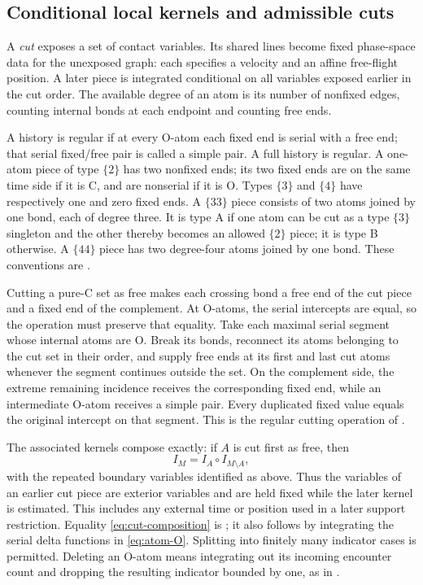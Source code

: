 \subsection{Conditional local kernels and admissible cuts}

A \emph{cut} exposes a set of contact variables. Its shared lines
become fixed phase-space data for the unexposed graph: each specifies
a velocity and an affine free-flight position. A later piece is
integrated conditional on all variables exposed earlier in the cut
order. The available degree of an atom is its number of nonfixed edges,
counting internal bonds at each endpoint and counting free ends.

A history is regular if at every O-atom each fixed end is serial
with a free end; that serial
fixed/free pair is called a simple pair. A full history is regular.
A one-atom piece of type \(\{2\}\) has two nonfixed ends; its two fixed
ends are on the same time side if it is C, and are nonserial if it is O.
Types \(\{3\}\) and \(\{4\}\) have respectively one and zero fixed
ends. A \(\{33\}\) piece consists of two atoms joined by one bond,
each of degree three. It is type A if one atom can be cut as a type
\(\{3\}\) singleton and the other thereby becomes an allowed
\(\{2\}\) piece; it is type B
otherwise. A \(\{44\}\) piece has two degree-four atoms joined by one
bond. These conventions are
\cite[Definitions 8.2 and 8.11]{DHM2025}.

Cutting a pure-C set as free makes each crossing bond a free end of the
cut piece and a fixed end of the complement. At O-atoms, the serial
intercepts are equal, so the operation must preserve that equality.
Take each maximal serial segment whose internal atoms are O. Break its
bonds, reconnect its atoms belonging to the cut set in their order,
and supply free ends at its first and last cut atoms whenever the
segment continues outside the set. On the complement side, the extreme
remaining incidence receives the corresponding fixed end, while an
intermediate O-atom receives a simple pair. Every duplicated fixed
value equals the original intercept on that segment. This is the
regular cutting operation of \cite[Definition 8.3]{DHM2025}.

The associated kernels compose exactly: if \(A\) is cut first as free,
then
\begin{equation}\label{eq:cut-composition}
 I_M=I_A\circ I_{M\setminus A},
\end{equation}
with the repeated boundary variables identified as above. Thus the
variables of an earlier cut piece are exterior variables and are held
fixed while the later kernel is estimated. This includes any external
time or position used in a later support restriction. Equality
\eqref{eq:cut-composition} is
\cite[Proposition 8.14]{DHM2025}; it also follows by integrating the
serial delta functions in \eqref{eq:atom-O}. Splitting into finitely
many indicator cases is permitted. Deleting an O-atom means integrating
out its incoming encounter count and dropping the resulting indicator
bounded by one, as in \cite[Proposition 8.13]{DHM2025}.

